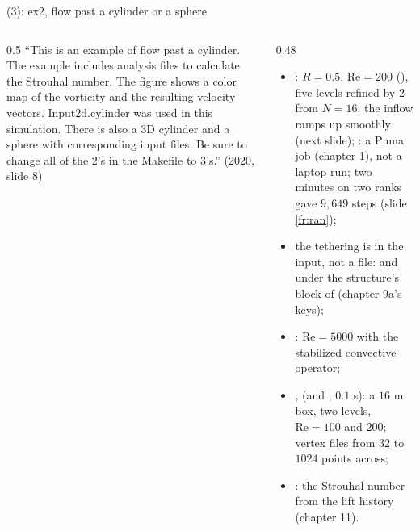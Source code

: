 \documentclass[aspectratio=169,11pt]{beamer}
\begin{document}
\begin{frame}[fragile]{ (3): ex2, flow past a cylinder or a sphere}
\label{fr:ib2}
\begin{columns}[T,onlytextwidth]
\begin{column}{0.5\textwidth}
\scriptsize ``This is an example of flow past a cylinder. The example includes analysis files to calculate the Strouhal number. The figure shows a color map of the vorticity and the resulting velocity vectors. Input2d.cylinder was used in this simulation. There is also a 3D cylinder and a sphere with corresponding input files. Be sure to change all of the 2's in the Makefile to 3's.'' (2020, slide 8)
\end{column}
\begin{column}{0.48\textwidth}
\begin{itemize}\scriptsize
  \item {}: $R = 0.5$, $\mathrm{Re} = 200$ (), five levels refined by 2 from $N = 16$; the inflow ramps up smoothly (next slide); : a Puma job (chapter 1), not a laptop run; two minutes on two ranks gave $9{,}649$ steps (slide \ref{fr:ran});
  \item the tethering is in the input, not a  file:  and  under the structure's block of  (chapter 9a's keys);
  \item {}: $\mathrm{Re} = 5000$ with the stabilized convective operator;
  \item {},  (and , $0.1$ s): a $16$ m box, two levels, $\mathrm{Re} = 100$ and $200$; vertex files from $32$ to $1024$ points across;
  \item {}: the Strouhal number from the lift history (chapter 11).
\end{itemize}

\end{column}
\end{columns}
\end{frame}
\end{document}
